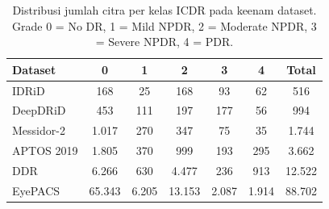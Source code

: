 \begin{table}[htbp]
\caption{Distribusi jumlah citra per kelas ICDR pada keenam dataset. Grade 0 = No DR, 1 = Mild NPDR, 2 = Moderate NPDR, 3 = Severe NPDR, 4 = PDR.}
\label{tab:distribusi}
\begin{center}
\small
\renewcommand{\arraystretch}{1.3}
\begin{tabular}{|l|c|c|c|c|c|c|}
\hline
\textbf{Dataset} & \textbf{0} & \textbf{1} & \textbf{2} & \textbf{3} & \textbf{4} & \textbf{Total} \\
\hline
IDRiD & 168 & 25 & 168 & 93 & 62 & 516 \\
\hline
DeepDRiD & 453 & 111 & 197 & 177 & 56 & 994 \\
\hline
Messidor-2 & 1.017 & 270 & 347 & 75 & 35 & 1.744 \\
\hline
APTOS 2019 & 1.805 & 370 & 999 & 193 & 295 & 3.662 \\
\hline
DDR & 6.266 & 630 & 4.477 & 236 & 913 & 12.522 \\
\hline
EyePACS & 65.343 & 6.205 & 13.153 & 2.087 & 1.914 & 88.702 \\
\hline
\end{tabular}
\end{center}\end{table}
